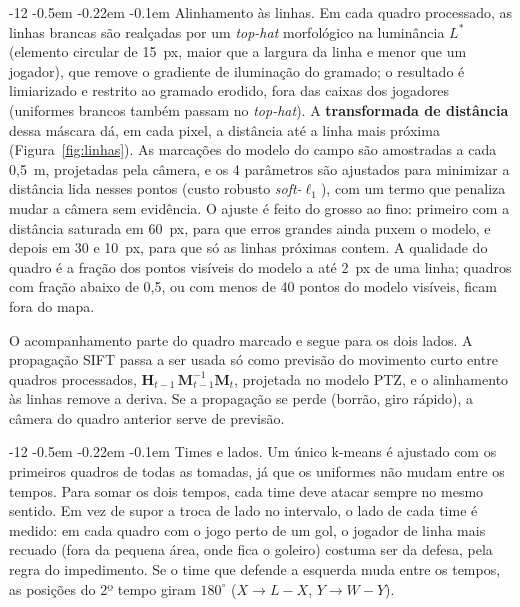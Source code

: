 \documentclass[12pt]{article}
\makeatletter
\renewcommand\paragraph{\@startsection{paragraph}{4}{\z@}%
                       {-12\p@ \@plus -4\p@ \@minus -4\p@}%
                       {-0.5em \@plus -0.22em \@minus -0.1em}%
                       {\normalfont\normalsize\itshape}}
\makeatother
\begin{document}
\paragraph{Alinhamento às linhas.} Em cada quadro processado, as linhas brancas são
realçadas por um \textit{top-hat} morfológico na luminância $L^*$ (elemento circular
de 15~px, maior que a largura da linha e menor que um jogador), que remove o
gradiente de iluminação do gramado; o resultado é limiarizado e restrito ao gramado
erodido, fora das caixas dos jogadores (uniformes brancos também passam no
\textit{top-hat}). A \textbf{transformada de distância} dessa máscara dá, em cada
pixel, a distância até a linha mais próxima (Figura~\ref{fig:linhas}). As marcações
do modelo do campo são amostradas a cada 0,5~m, projetadas pela câmera, e os 4
parâmetros são ajustados para minimizar a distância lida nesses pontos (custo
robusto \textit{soft-$\ell_1$}), com um termo que penaliza mudar a câmera sem
evidência. O ajuste é feito do grosso ao fino: primeiro com a distância saturada em
60~px, para que erros grandes ainda puxem o modelo, e depois em 30 e 10~px, para que
só as linhas próximas contem. A qualidade do quadro é a fração dos pontos visíveis
do modelo a até 2~px de uma linha; quadros com fração abaixo de 0,5, ou com menos de
40 pontos do modelo visíveis, ficam fora do mapa.

O acompanhamento parte do quadro marcado e segue para os dois lados. A propagação
SIFT passa a ser usada só como previsão do movimento curto entre quadros
processados, $\mathbf{H}_{t-1}\,\mathbf{M}_{t-1}^{-1}\mathbf{M}_t$, projetada no modelo
PTZ, e o alinhamento às linhas remove a deriva. Se a propagação se perde (borrão, giro
rápido), a câmera do quadro anterior serve de previsão.

\paragraph{Times e lados.} Um único k-means é ajustado com os primeiros quadros de
todas as tomadas, já que os uniformes não mudam entre os tempos. Para somar os dois
tempos, cada time deve atacar sempre no mesmo sentido. Em vez de supor a troca de
lado no intervalo, o lado de cada time é medido: em cada quadro com o jogo perto de
um gol, o jogador de linha mais recuado (fora da pequena área, onde fica o goleiro)
costuma ser da defesa, pela regra do impedimento. Se o time que defende a esquerda
muda entre os tempos, as posições do 2º tempo giram $180^\circ$
($X \rightarrow L - X$, $Y \rightarrow W - Y$).
\end{document}
